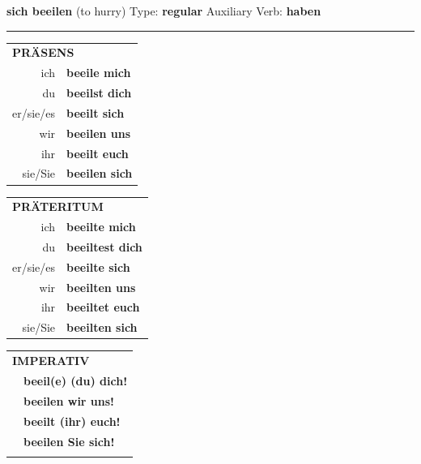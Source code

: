 \documentclass[10pt,a4paper]{revtex4-2}
\begin{document}
\begin{verbbox}
        {\Large \bf sich beeilen} (to hurry) \hfill Type: \textbf{regular} \hfill Auxiliary Verb: \textbf{haben} 
    
       \vspace{5pt}

    \hrule
    
    \vspace{5pt}

  \begin{tabular}{rl}
     \multicolumn{2}{l}{\textbf{PRÄSENS} }\\
    ich & \textbf{beeile mich}\\
    du & \textbf{beeilst dich}\\
    er/sie/es & \textbf{beeilt sich}\\
    wir & \textbf{beeilen uns}\\
    ihr & \textbf{beeilt euch}\\
    sie/Sie & \textbf{beeilen sich}\\
  \end{tabular}
  \hfill
     \begin{tabular}{rl}
    \multicolumn{2}{l}{\textbf{PRÄTERITUM} }\\
    ich & \textbf{beeilte mich}\\
    du & \textbf{beeiltest dich}\\
    er/sie/es & \textbf{beeilte sich}\\
    wir & \textbf{beeilten uns}\\
    ihr & \textbf{beeiltet euch}\\
    sie/Sie & \textbf{beeilten sich}\\
  \end{tabular}
  \hfill
  \begin{tabular}{rl}
     \multicolumn{2}{l}{\textbf{IMPERATIV} }\\
   & \textbf{beeil(e) (du) dich!}\\
   & \textbf{beeilen wir uns!}\\
   & \textbf{beeilt (ihr) euch!}\\
   & \textbf{beeilen Sie sich!}\\
   & \vspace{10pt}
  \end{tabular}

    \vspace{10pt}


\end{verbbox}
\end{document}
